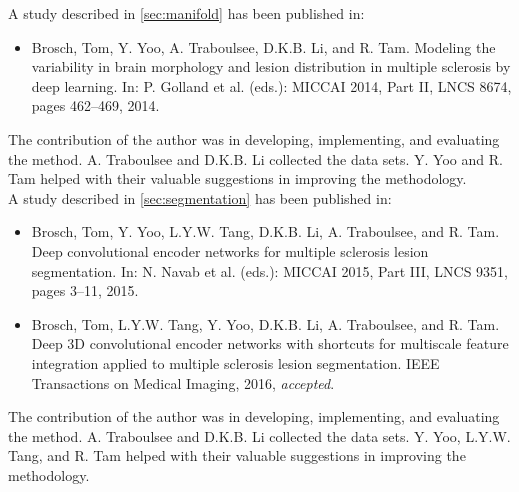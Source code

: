 A study described in \ref{sec:manifold} has been published in:
\begin{itemize}
\item Brosch, Tom, Y. Yoo, A. Traboulsee, D.K.B. Li, and R. Tam. Modeling the
variability in brain morphology and lesion distribution in multiple sclerosis by
deep learning. In: P. Golland et al. (eds.): MICCAI 2014, Part II, LNCS 8674,
pages 462--469, 2014.
\end{itemize}
The contribution of the author was in developing, implementing, and evaluating
the method. A. Traboulsee and D.K.B. Li collected the data sets. Y. Yoo and R.
Tam helped with their valuable suggestions in improving the methodology.
\\[1em]
A study described in \ref{sec:segmentation} has been published in:
\begin{itemize}
\item Brosch, Tom, Y. Yoo, L.Y.W. Tang, D.K.B. Li, A. Traboulsee, and R. Tam.
Deep convolutional encoder networks for multiple sclerosis lesion segmentation.
In: N. Navab et al. (eds.): MICCAI 2015, Part III, LNCS 9351, pages 3--11, 2015.
\item Brosch, Tom, L.Y.W. Tang, Y. Yoo, D.K.B. Li, A. Traboulsee, and R. Tam.
Deep 3D convolutional encoder networks with shortcuts for multiscale feature
integration applied to multiple sclerosis lesion segmentation. IEEE Transactions
on Medical Imaging, 2016, \emph{accepted}.
\end{itemize}
The contribution of the author was in developing, implementing, and evaluating
the method. A. Traboulsee and D.K.B. Li collected the data sets. Y. Yoo, L.Y.W.
Tang, and R. Tam helped with their valuable suggestions in improving the
methodology.
